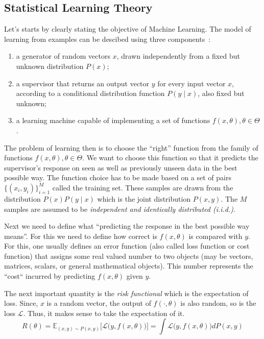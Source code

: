 \documentclass[11pt]{article}
\begin{document}
\subsection{Statistical Learning Theory}
Let's starts by clearly stating the objective of Machine Learning. The model of
learning from examples can be descibed using three components~\cite{slt}:
\begin{enumerate}
    \item a generator of random vectors $x$, drawn independently from a fixed
        but unknown distribution $P(x)$;
    \item a supervisor that returns an output vector $y$ for every input vector
        $x$, according to a conditional distribution function $P(y\;\lvert\;x)$,
        also fixed but unknown;
    \item a learning machine capable of implementing a set of functions
        $f(x,\theta), \theta\in\Theta$.
\end{enumerate}
The problem of learning then is to choose the ``right'' function from the family
of functions $f(x,\theta), \theta\in\Theta$. We want to choose this function so
that it predicts the supervisor's response on seen as well as previously unseen
data in the best possible way. The function choice has to be made based on a set
of pairs $\{(x_i,y_i)\}_{i=1}^M$ called the training set. These samples are
drawn from the distribution $P(x)P(y\;\lvert\;x)$ which is the joint
distribution $P(x,y)$. The $M$ samples are assumed to be {\em independent and
identically distributed (i.i.d.)}.\par
Next we need to define what ``predicting the response in the best possible way
means''. For this we need to define how correct is $f(x,\theta)$ is compared
with
$y$. For this, one usually defines an error function (also called loss function or
cost function) that assigns some real valued number to two objects (may be
vectors, matrices, scalars, or general mathematical objects). This number
represents the ``cost`` incurred by predicting $f(x,\theta)$ given $y$.\par
The next important quantity is the {\em risk functional} which is the
expectation of loss. Since, $x$ is a random vector, the output of
$f(\cdot,\theta)$ is also random, so is the loss $\mathcal{L}$. Thus, it makes
sense to take the expectation of it.
\begin{equation}
    R(\theta)=\mathbb{E}_{(x,y)\sim
    P(x,y)}\biggl[\mathcal{L}\bigl(y,f(x,\theta)\bigr)\biggr]=\int
    \mathcal{L}\bigl(y,f(x,\theta)\bigr)dP(x,y)
\end{equation}
\end{document}
